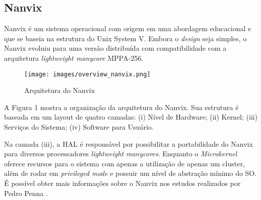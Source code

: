 \subsection{Nanvix}

Nanvix é um sistema operacional com origem em uma abordagem educacional \cite{NanvixEdu} e que se baseia na estrutura do Unix System V. Embora o \emph{design} seja simples, o Nanvix evoluiu para uma versão distribuída com compatibilidade com a arquitetura \textit{lightweight manycore} MPPA-256.

\begin{figure}[h!]
    \centering
    \texttt{[image: images/overview\_nanvix.png]}
    \caption{Arquitetura do Nanvix \\ \cite{penna:tel-03545212}}
\end{figure}

A Figura 1 mostra a organização da arquitetura do Nanvix. Sua estrutura é baseada em um layout de quatro camadas: (i) Nível de Hardware; (ii) Kernel; 
(iii) Serviços do Sistema; (iv) Software para Usuário.

Na camada (iii), a HAL é responsável por possibilitar a portabilidade do Nanvix para diversos processadores \emph{lightweight manycores}. Enquanto o \emph{Microkernel} 
oferece recursos para o sistema com apenas a utilização de apenas um cluster, além de rodar em \emph{privileged mode} e possuir um nível de abstração mínimo do SO. 
É possível obter mais informações sobre o Nanvix nos estudos realizados por Pedro Penna \cite{penna:tel-03545212}.
